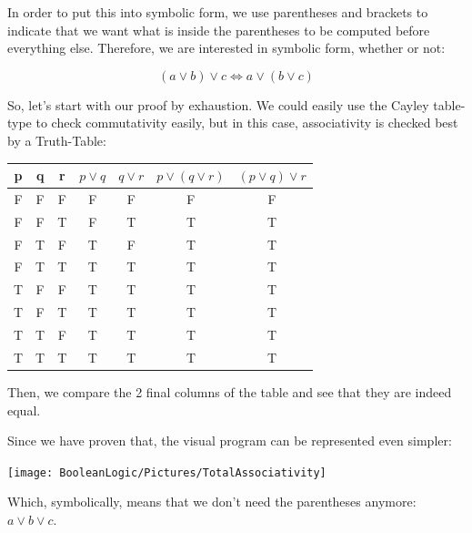 In order to put this into symbolic form, we use parentheses and brackets to indicate that we want what is inside the parentheses to be computed before everything else. Therefore, we are interested in symbolic form, whether or not:

$$
    (a \vee b) \vee c \iff a \vee (b \vee c)
$$

So, let's start with our proof by exhaustion. We could easily use the Cayley table-type to check commutativity easily, but in this case, associativity is checked best by a Truth-Table:

\begin{table}[ht]
\centering
\begin{tabular}{|c|c|c|c|c|c|c|}
\hline
p & q & r & $p \vee q$ & $q \vee r$ & $p \vee (q \vee r)$ & $(p \vee q) \vee r$ \\ \hline
F & F & F & F       & F       & F               & F               \\ \hline
F & F & T & F       & T       & T               & T               \\ \hline
F & T & F & T       & F       & T               & T               \\ \hline
F & T & T & T       & T       & T               & T               \\ \hline
T & F & F & T       & T       & T               & T               \\ \hline
T & F & T & T       & T       & T               & T               \\ \hline
T & T & F & T       & T       & T               & T               \\ \hline
T & T & T & T       & T       & T               & T               \\ \hline
\end{tabular}
\end{table}

Then, we compare the 2 final columns of the table and see that they are indeed equal.
\begin{samepage}

Since we have proven that, the visual program can be represented even simpler:

\begin{center}
    \texttt{[image: BooleanLogic/Pictures/TotalAssociativity]}
\end{center}

Which, symbolically, means that we don't need the parentheses anymore: $a \vee b \vee c$.
\end{samepage}

